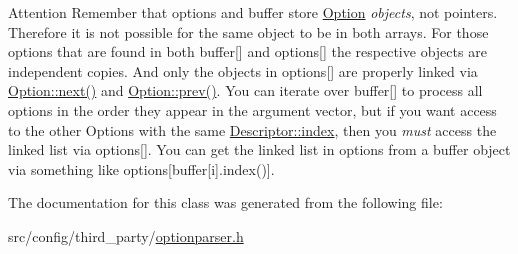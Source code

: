 \begin{DoxyAttention}{Attention}
Remember that {\ttfamily options} and {\ttfamily buffer} store \hyperlink{classxmem_1_1config_1_1third__party_1_1_option}{Option} {\itshape objects}, not pointers. Therefore it is not possible for the same object to be in both arrays. For those options that are found in both {\ttfamily buffer}\mbox{[}\mbox{]} and {\ttfamily options}\mbox{[}\mbox{]} the respective objects are independent copies. And only the objects in {\ttfamily options}\mbox{[}\mbox{]} are properly linked via \hyperlink{classxmem_1_1config_1_1third__party_1_1_option_af9c5d2de03863bbcdc05a1d6771f1f36}{Option\+::next()} and \hyperlink{classxmem_1_1config_1_1third__party_1_1_option_a51c55046e8f111be3e329f798d0f72b9}{Option\+::prev()}. You can iterate over {\ttfamily buffer}\mbox{[}\mbox{]} to process all options in the order they appear in the argument vector, but if you want access to the other Options with the same \hyperlink{structxmem_1_1config_1_1third__party_1_1_descriptor_aacf3d44f35c61f22be65da078f60734b}{Descriptor\+::index}, then you {\itshape must} access the linked list via {\ttfamily options}\mbox{[}\mbox{]}. You can get the linked list in options from a buffer object via something like {\ttfamily options}\mbox{[}buffer\mbox{[}i\mbox{]}.index()\mbox{]}. 
\end{DoxyAttention}


The documentation for this class was generated from the following file\+:\begin{DoxyCompactItemize}
\item 
src/config/third\+\_\+party/\hyperlink{optionparser_8h}{optionparser.\+h}\end{DoxyCompactItemize}

